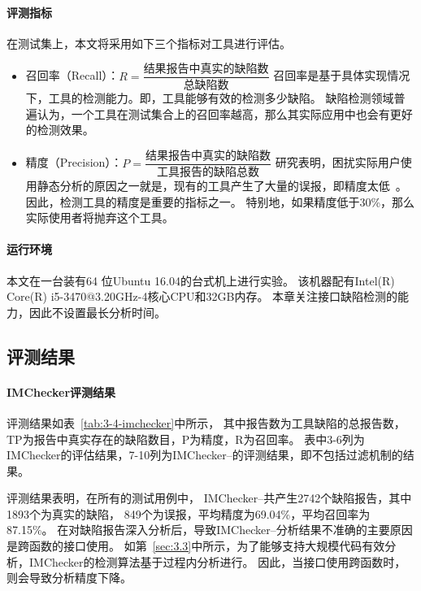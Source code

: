 \paragraph{评测指标}
在测试集上，本文将采用如下三个指标对工具进行评估。
\begin{itemize}
	\item 召回率（Recall）：$R = \dfrac{\text{结果报告中真实的缺陷数}}{\text{总缺陷数}}$
	召回率是基于具体实现情况下，工具的检测能力。即，工具能够有效的检测多少缺陷。
	缺陷检测领域普遍认为，一个工具在测试集合上的召回率越高，那么其实际应用中也会有更好的检测效果。
	\item 精度（Precision）：$P = \dfrac{\text{结果报告中真实的缺陷数}}{\text{工具报告的缺陷总数}}$
	研究表明，困扰实际用户使用静态分析的原因之一就是，现有的工具产生了大量的误报，即精度太低~\cite{10-acm-precision}。因此，检测工具的精度是重要的指标之一。
	特别地，如果精度低于30\%，那么实际使用者将抛弃这个工具。
\end{itemize}

\paragraph{运行环境} 本文在一台装有64 位Ubuntu 16.04的台式机上进行实验。
该机器配有Intel(R) Core(R) i5-3470@3.20GHz-4核心CPU和32GB内存。
本章关注接口缺陷检测的能力，因此不设置最长分析时间。


\subsection{评测结果}


\paragraph{IMChecker评测结果}
评测结果如表~\ref{tab:3-4-imchecker}中所示，
其中报告数为工具缺陷的总报告数，TP为报告中真实存在的缺陷数目，P为精度，R为召回率。
表中3-6列为IMChecker的评估结果，7-10列为IMChecker--的评测结果，即不包括过滤机制的结果。

评测结果表明，在所有的测试用例中，
IMChecker--共产生2742个缺陷报告，其中1893个为真实的缺陷，
849个为误报，平均精度为69.04\%，平均召回率为87.15\%。
在对缺陷报告深入分析后，导致IMChecker--分析结果不准确的主要原因是跨函数的接口使用。
如第~\ref{sec:3.3}中所示，为了能够支持大规模代码有效分析，IMChecker的检测算法基于过程内分析进行。
因此，当接口使用跨函数时，则会导致分析精度下降。

